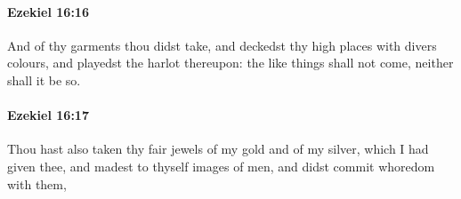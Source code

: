 		\paragraph{Ezekiel 16:16} %
			\label{EZEKIEL-16-16}

			And of thy garments thou didst take, and deckedst thy high places with divers colours, and playedst the harlot thereupon: the like things shall not come, neither shall it be so.


		\paragraph{Ezekiel 16:17} %
			\label{EZEKIEL-16-17}

			Thou hast also taken thy fair jewels of my gold and of my silver, which I had given thee, and madest to thyself images of men, and didst commit whoredom with them,


